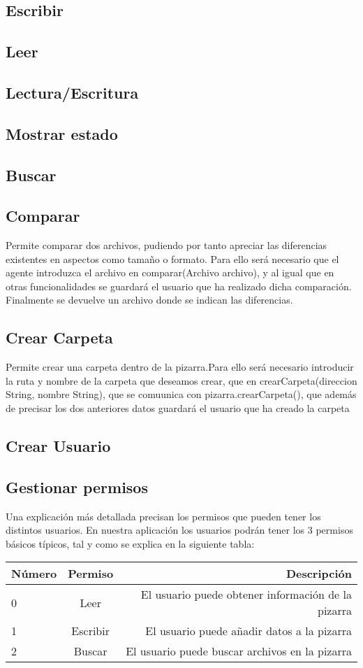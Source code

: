 \subsection{Escribir}
\subsection{Leer}
\subsection{Lectura/Escritura}
\subsection{Mostrar estado}
\subsection{Buscar}

\subsection{Comparar}
Permite comparar dos archivos, pudiendo por tanto apreciar las diferencias existentes en  aspectos como tamaño o formato. Para ello será necesario que el agente introduzca el archivo en comparar(Archivo archivo), y al igual que en otras funcionalidades se guardará el usuario que ha realizado dicha comparación. Finalmente se devuelve un archivo donde se indican las diferencias.
\subsection{Crear Carpeta}
Permite crear una carpeta dentro de la pizarra.Para ello será necesario introducir la ruta y nombre de la carpeta que deseamos crear, que en crearCarpeta(direccion String, nombre String), que se comuunica con pizarra.crearCarpeta(), que además de precisar los dos anteriores datos guardará el usuario que ha creado la carpeta
\subsection{Crear Usuario}
\subsection{Gestionar permisos}
Una explicación más detallada precisan los permisos que pueden tener los distintos usuarios. En nuestra aplicación los usuarios podrán tener los 3 permisos básicos típicos, tal y como se explica en la siguiente tabla: \\
\begin{tabular}{||l | c | r||}
\hline
\hline
Número & Permiso  & Descripción \\
\hline
0& Leer & El usuario puede obtener información de la pizarra\\
1& Escribir & El usuario puede añadir datos a la pizarra\\
2& Buscar & El usuario puede buscar archivos en la pizarra\\
\hline
\end{tabular}

